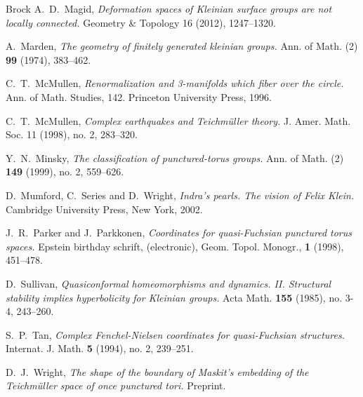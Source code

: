 \documentclass[12pt]{article}
\theoremstyle{plain}
\theoremstyle{definition}
\theoremstyle{remark}
\begin{document}
\begin{thebibliography}{Brock}
A.~D.~Magid,  
{\it Deformation spaces of Kleinian surface groups are not locally connected.}
Geometry \& Topology 16 (2012), 1247--1320. 

A.~Marden, 
{\it The geometry of finitely generated kleinian groups.}  
Ann. of Math. (2) {\bf 99} (1974), 383--462. 

C.~T.~McMullen, {\it Renormalization and 3-manifolds which fiber over the circle.}  
Ann. of Math. Studies, 142. Princeton University Press, 1996.

C.~T.~McMullen, {\it Complex earthquakes and Teichm\"{u}ller theory.} 
J. Amer. Math. Soc. 11 (1998), no. 2, 283--320. 

Y.~N.~Minsky, {\it 
The classification of punctured-torus groups.}  
Ann. of Math. (2) {\bf 149} (1999), no. 2, 559--626. 

D.~Mumford, C.~Series and D.~Wright, 
{\it Indra's pearls. 
The vision of Felix Klein.} 
 Cambridge University Press, New York, 2002.

J.~R.~Parker and J.~Parkkonen, 
{\it Coordinates for quasi-Fuchsian punctured torus spaces.} Epstein birthday schrift, (electronic), 
Geom. Topol. Monogr., {\bf 1} (1998), 451--478. 

D.~Sullivan, 
{\it Quasiconformal homeomorphisms and dynamics. II. 
Structural stability implies hyperbolicity for Kleinian groups.}  
Acta Math. {\bf 155} (1985), no. 3-4, 243--260. 

S.~P.~Tan, 
{\it Complex Fenchel-Nielsen coordinates for quasi-Fuchsian structures.} 
Internat. J. Math. {\bf 5} (1994), no. 2, 239--251.

D.~J.~Wright, 
{\it  The shape of the boundary of Maskit's embedding of the Teichm\"{u}ller space of once punctured tori.} Preprint.

\end{thebibliography}
\end{document}
